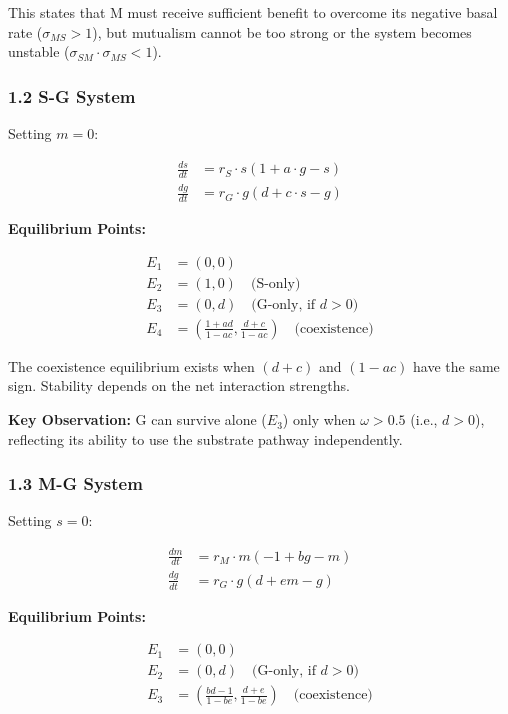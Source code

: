 \documentclass[11pt]{article}
\begin{document}
This states that M must receive sufficient benefit to overcome its negative basal rate ($\sigma_{MS} > 1$), but mutualism cannot be too strong or the system becomes unstable ($\sigma_{SM}\cdot\sigma_{MS} < 1$).

\subsubsection{1.2 S-G System}

Setting $m = 0$:

\begin{align}
\frac{ds}{dt} &= r_S \cdot s(1 + a \cdot g - s)\\
\frac{dg}{dt} &= r_G \cdot g(d + c \cdot s - g)
\end{align}

\textbf{Equilibrium Points:}

\begin{align}
E_1 &= (0, 0)\\
E_2 &= (1, 0) \quad \text{(S-only)}\\
E_3 &= (0, d) \quad \text{(G-only, if } d > 0 \text{)}\\
E_4 &= \left(\frac{1+ad}{1-ac}, \frac{d+c}{1-ac}\right) \quad \text{(coexistence)}
\end{align}

The coexistence equilibrium exists when $(d+c)$ and $(1-ac)$ have the same sign. Stability depends on the net interaction strengths.

\textbf{Key Observation:} G can survive alone ($E_3$) only when $\omega > 0.5$ (i.e., $d > 0$), reflecting its ability to use the substrate pathway independently.

\subsubsection{1.3 M-G System}

Setting $s = 0$:

\begin{align}
\frac{dm}{dt} &= r_M \cdot m(-1 + bg - m)\\
\frac{dg}{dt} &= r_G \cdot g(d + em - g)
\end{align}

\textbf{Equilibrium Points:}

\begin{align}
E_1 &= (0, 0)\\
E_2 &= (0, d) \quad \text{(G-only, if } d > 0 \text{)}\\
E_3 &= \left(\frac{bd-1}{1-be}, \frac{d+e}{1-be}\right) \quad \text{(coexistence)}
\end{align}
\end{document}
